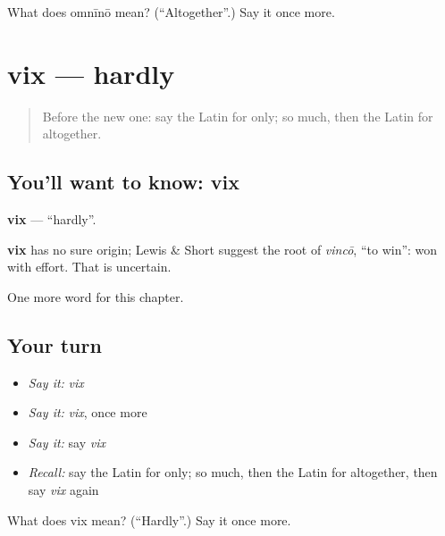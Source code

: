 \begin{tcolorbox}[breakable,colback=teal!4,colframe=teal!35!black,title={Before you move on}]
What does omnīnō mean? (\textquotedblleft{}Altogether\textquotedblright{}.) Say it once more.
\end{tcolorbox}
\section[vix]{vix — hardly}

\label{lesson:LA-C211-vix}



\begin{quote}
Before the new one: say the Latin for only; so much, then the Latin for altogether.
\end{quote}

\subsection*{You'll want to know: vix}
\textbf{vix} — \textquotedblleft{}hardly\textquotedblright{}.

\begin{cousinweb}
\textbf{vix} has no sure origin; Lewis \& Short suggest the root of \emph{vincō}, \textquotedblleft{}to win\textquotedblright{}: won with effort. That is uncertain.
\end{cousinweb}

\begin{grammarlens}[title={What you've built}]
One more word for this chapter.
\end{grammarlens}

\subsection*{Your turn}
\begin{itemize}
\raggedright
  \item \emph{Say it:} \emph{vix}
  \item \emph{Say it:} \emph{vix}, once more
  \item \emph{Say it:} say \emph{vix}
  \item \emph{Recall:} say the Latin for only; so much, then the Latin for altogether, then say \emph{vix} again
\end{itemize}

\begin{tcolorbox}[breakable,colback=teal!4,colframe=teal!35!black,title={Before you move on}]
What does vix mean? (\textquotedblleft{}Hardly\textquotedblright{}.) Say it once more.
\end{tcolorbox}
